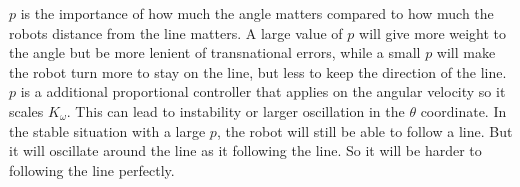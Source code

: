 $p$ is the importance of how much the angle matters compared to how much the robots distance from the line matters. A large value of $p$ will give more weight to the angle but be more lenient of transnational errors, while a small $p$ will make the robot turn more to stay on the line, but less to keep the direction of the line. $p$ is a additional proportional controller that applies on the angular velocity so it scales $K_\omega$. This can lead to instability or larger oscillation in the $\theta$ coordinate. In the stable situation with a large $p$, the robot will still be able to follow a line. But it will oscillate around the line as it following the line. So it will be harder to following the line perfectly. 
